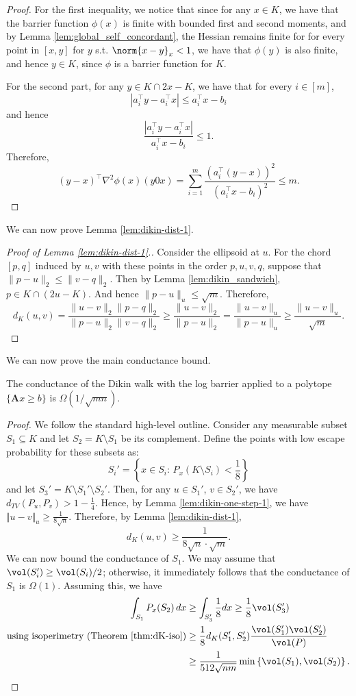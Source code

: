 \begin{proof}
For the first inequality, we notice that since for any $x\in K$,
we have that the barrier function $\phi(x)$ is finite with bounded
first and second moments, and by Lemma \ref{lem:global_self_concordant},
the Hessian remains finite for for every point in $[x,y]$ for $y$
s.t. $\norm{x-y}_{x}<1$, we have that $\phi(y)$ is also finite,
and hence $y\in K$, since $\phi$ is a barrier function for $K$. 

For the second part, for any $y\in K\cap2x-K$, we have that for every
$i\in[m]$, 
\[
\left|a_{i}^{\top}y-a_{i}^{\top}x\right|\le a_{i}^{\top}x-b_{i}
\]
and hence 
\[
\frac{\left|a_{i}^{\top}y-a_{i}^{\top}x\right|}{a_{i}^{\top}x-b_{i}}\le1.
\]
Therefore, 
\[
(y-x)^{\top}\nabla^{2}\phi(x)(y0x)=\sum_{i=1}^{m}\frac{\left(a_{i}^{\top}(y-x)\right)^{2}}{\left(a_{i}^{\top}x-b_{i}\right)^{2}}\le m.
\]
\end{proof}
We can now prove Lemma \ref{lem:dikin-dist-1}.
\begin{proof}[Proof of Lemma \ref{lem:dikin-dist-1}.]
 Consider the ellipsoid at $u$. For the chord $[p,q]$ induced by
$u,v$ with these points in the order $p,u,v,q$, suppose that $\|p-u\|_{2}\le\|v-q\|_{2}$.
Then by Lemma \ref{lem:dikin_sandwich}, $p\in K\cap(2u-K)$. And
hence $\|p-u\|_{u}\le\sqrt{m}.$ Therefore, 
\[
d_{K}(u,v)=\frac{\|u-v\|_{2}\|p-q\|_{2}}{\|p-u\|_{2}\|v-q\|_{2}}\geq\frac{\|u-v\|_{2}}{\|p-u\|_{2}}=\frac{\|u-v\|_{u}}{\|p-u\|_{u}}\ge\frac{\|u-v\|_{u}}{\sqrt{m}}.
\]
\end{proof}
We can now prove the main conductance bound.
\begin{thm}
The conductance of the Dikin walk with the log barrier applied to
a polytope $\{\mathbf{A}x\ge b\}$ is $\Omega(1/\sqrt{mn})$.
\end{thm}

\begin{proof}
We follow the standard high-level outline. Consider any measurable
subset $S_{1}\subseteq K$ and let $S_{2}=K\setminus S_{1}$ be its
complement. Define the points with low escape probability for these
subsets as:
\[
S_{i}'=\left\{ x\in S_{i}:\,P_{x}(K\setminus S_{i})<\frac{1}{8}\right\} 
\]
and let $S_{3}'=K\setminus S_{1}'\setminus S_{2}'$. Then, for any
$u\in S_{1}'$, $v\in S_{2}'$, we have $d_{TV}(P_{u},P_{v})>1-\frac{1}{4}$.
Hence, by Lemma \ref{lem:dikin-one-step-1}, we have $\Vert u-v\Vert_{u}\ge\frac{1}{8\sqrt{n}}$.
Therefore, by Lemma \ref{lem:dikin-dist-1}, 
\[
d_{K}(u,v)\ge\frac{1}{8\sqrt{n}\cdot\sqrt{m}}.
\]
We can now bound the conductance of $S_{1}$. We may assume that $\vol(S_{i}')\ge\vol(S_{i})/2$;
otherwise, it immediately follows that the conductance of $S_{1}$
is $\Omega(1)$. Assuming this, we have
\begin{align*}
\int_{S_{1}}P_{x}(S_{2})\,dx & \ge\int_{S_{3}'}\frac{1}{8}dx\ge\frac{1}{8}\vol(S_{3}')\\
\mbox{using isoperimetry (Theorem \ref{thm:dK-iso})} & \ge\frac{1}{8}d_{K}(S_{1}',S_{2}')\frac{\vol(S_{1}')\vol(S_{2}')}{\vol(P)}\\
 & \ge\frac{1}{512\sqrt{nm}}\min\left\{ \vol(S_{1}),\vol(S_{2})\right\} .
\end{align*}
\end{proof}

